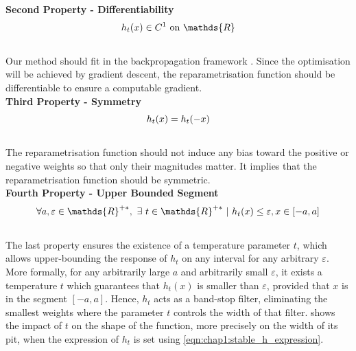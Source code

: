 \noindent\textbf{Second Property - Differentiability} \\
\begin{equation}
  \centering
  h_t(x) \in C^1 \text{ on } \mathds{R}
  \label{eqn:chap1:reparam_prop2}
\end{equation}
\\
Our method should fit in the backpropagation framework \cite{rumelhart1986learning}. Since the optimisation will
be achieved by gradient descent, the reparametrisation function should be
differentiable to ensure a computable gradient.\\

\noindent\textbf{Third Property - Symmetry} \\

\begin{equation}
  \centering
  h_t(x) = h_t(-x)
  \label{eqn:chap1:reparam_prop3}
\end{equation}
\\
The reparametrisation function should not induce any bias toward the positive or
negative weights so that only their magnitudes matter. It implies that the
reparametrisation function should be symmetric.\\


\noindent\textbf{Fourth Property - Upper Bounded Segment} \\

\begin{equation}
  \centering
  \forall a,\varepsilon \in\mathds{R}^{+\ast},~ \exists ~t
  \in\mathds{R}^{+\ast} ~ | ~ h_t(x) \leq \varepsilon, x \in [-a,a]
  \label{eqn:chap1:reparam_prop4}
\end{equation}
\\
The last property ensures the existence of a temperature parameter $t$, which
allows upper-bounding the response of $h_t$ on any interval for any arbitrary
$\varepsilon$. More formally, for any arbitrarily large $a$ and arbitrarily
small $\varepsilon$, it exists a temperature $t$ which guarantees that $h_t(x)$
is smaller than $\varepsilon$, provided that $x$ is in the segment $[-a, a]$.
Hence, $h_t$ acts as a band-stop filter, eliminating the smallest weights where
the parameter $t$ controls the width of that filter.
 shows the impact of $t$ on the shape of
the function, more precisely on the width of its pit, when the expression of
$h_t$ is set using \cref{eqn:chap1:stable_h_expression}.\\

